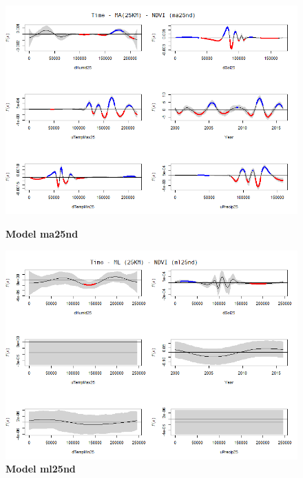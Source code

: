 \begin{figure}[H]
 \centering
    \begin{minipage}{0.8\textwidth}
        \centering
        \includegraphics[width=1.2\textwidth]{ma25nd.png} %
        \caption{\textbf{Model ma25nd}}
    \end{minipage}\hfill
    \begin{minipage}{0.8\textwidth}
        \centering
        \includegraphics[width=1.2\textwidth]{ml25nd.png} %
        \caption{\textbf{Model ml25nd}}
    \end{minipage}
\end{figure}

